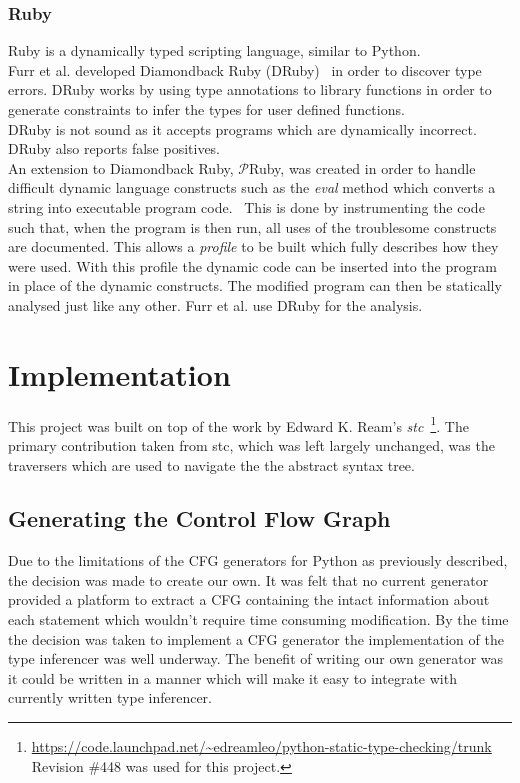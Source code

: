 \documentclass[12pt, titlepage]{article}
\begin{document}
\subsubsection{Ruby}
Ruby is a dynamically typed scripting language, similar to Python. \\
Furr et al. developed Diamondback Ruby (DRuby)~\cite{furr09} in order to discover type errors. DRuby works by using type annotations to library functions in order to generate constraints to infer the types for user defined functions. \\
DRuby is not sound as it accepts programs which are dynamically incorrect. DRuby also reports false positives. \\
An extension to Diamondback Ruby, $\mathcal{P}$Ruby, was created in order to handle difficult dynamic language constructs such as the \textit{eval} method which converts a string into executable program code.~\cite{pRuby} This is done by instrumenting the code such that, when the program is then run, all uses of the troublesome constructs are documented. This allows a \textit{profile} to be built which fully describes how they were used. With this profile the dynamic code can be inserted into the program in place of the dynamic constructs. The modified program can then be statically analysed just like any other. Furr et al. use DRuby for the analysis.

\newpage
\section{Implementation}
This project was built on top of the work by Edward K. Ream's \textit{stc}~\footnote{\url{https://code.launchpad.net/~edreamleo/python-static-type-checking/trunk} Revision \#448 was used for this project.}. The primary contribution taken from stc, which was left largely unchanged, was the traversers which are used to navigate the the abstract syntax tree.

\subsection{Generating the Control Flow Graph}
Due to the limitations of the CFG generators for Python as previously described, the decision was made to create our own. It was felt that no current generator provided a platform to extract a CFG containing the intact information about each statement which wouldn't require time consuming modification. By the time the decision was taken to implement a CFG generator the implementation of the type inferencer was well underway. The benefit of writing our own generator was it could be written in a manner which will make it easy to integrate with currently written type inferencer. \\
\end{document}
